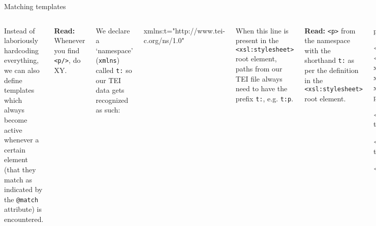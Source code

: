 \begin{frame}[fragile]{Matching templates}
\footnotesize
\begin{columns}
Instead of laboriously hardcoding everything, we can also define templates which always become active whenever a certain element (that they match as indicated by the \texttt{@match} attribute) is encountered.\smallskip

\textbf{Read:} Whenever you find \texttt{<p/>}, do XY.

We declare a `namespace' (\texttt{xmlns}) called \texttt{t:} so our TEI data gets recognized as such:
\begin{xmlcode}
xmlns:t="http://www.tei-c.org/ns/1.0"
\end{xmlcode}
When this line is present in the \texttt{<xsl:stylesheet>} root element, paths from our TEI file always need to have the prefix \texttt{t:}, e.g. \texttt{t:p}.\smallskip

\textbf{Read:} \texttt{<p>} from the namespace with the shorthand \texttt{t:} as per the definition in the \texttt{<xsl:stylesheet>} root element.

\begin{block}{processing/creating \texttt{<p>} elements in the output}
\begin{xmlcode}
<?xml version="1.0" encoding="UTF-8"?>
<xsl:stylesheet xmlns:xsl="http://www.w3.org/1999/XSL/Transform"
    xmlns:xs="http://www.w3.org/2001/XMLSchema"
    xmlns:t="http://www.tei-c.org/ns/1.0"
    exclude-result-prefixes="xs"
    version="2.0">
       
    <xsl:template match="/">
        <xml>
            <xsl:apply-templates/> 
        </xml>
    </xsl:template>
    
    <xsl:template match="t:p">
        <new>
            <xsl:apply-templates/>
        </new>
    </xsl:template>
    
</xsl:stylesheet>
\end{xmlcode}
\end{block}
\end{columns}

\end{frame}

